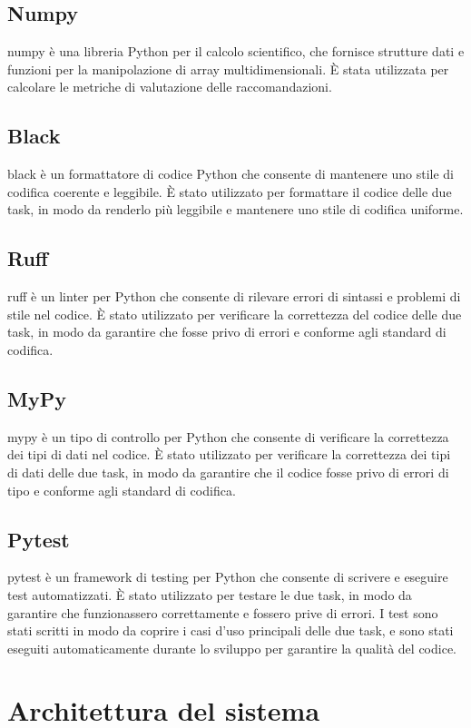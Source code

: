 \subsection{Numpy}
\gls{numpy} è una libreria Python per il calcolo scientifico, che fornisce strutture dati e funzioni per la manipolazione di array multidimensionali. È stata utilizzata per calcolare le metriche di valutazione delle raccomandazioni.

\subsection{Black}
\gls{black} è un formattatore di codice Python che consente di mantenere uno stile di codifica coerente e leggibile. È stato utilizzato per formattare il codice delle due task, in modo da renderlo più leggibile e mantenere uno stile di codifica uniforme.

\subsection{Ruff}
\gls{ruff} è un linter per Python che consente di rilevare errori di sintassi e problemi di stile nel codice. È stato utilizzato per verificare la correttezza del codice delle due task, in modo da garantire che fosse privo di errori e conforme agli standard di codifica.

\subsection{MyPy}
\gls{mypy} è un tipo di controllo per Python che consente di verificare la correttezza dei tipi di dati nel codice. È stato utilizzato per verificare la correttezza dei tipi di dati delle due task, in modo da garantire che il codice fosse privo di errori di tipo e conforme agli standard di codifica.

\subsection{Pytest}
\gls{pytest} è un framework di testing per Python che consente di scrivere e eseguire test automatizzati. È stato utilizzato per testare le due task, in modo da garantire che funzionassero correttamente e fossero prive di errori. I test sono stati scritti in modo da coprire i casi d'uso principali delle due task, e sono stati eseguiti automaticamente durante lo sviluppo per garantire la qualità del codice.


\section{Architettura del sistema}

